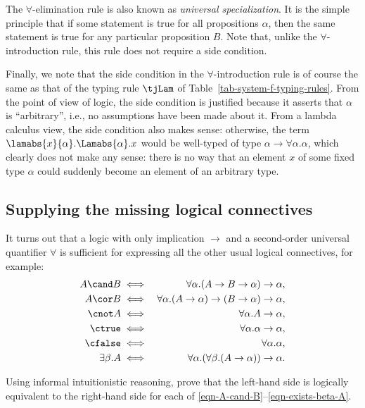 \documentclass[12pt]{article}
\begin{document}
The $\forall$-elimination rule is also known as {\em universal
  specialization}. It is the simple principle that if some statement
is true for all propositions $\alpha$, then the same statement is true for
any particular proposition $B$. Note that, unlike the $\forall$-introduction
rule, this rule does not require a side condition. 

Finally, we note that the side condition in the $\forall$-introduction
rule is of course the same as that of the typing rule $\tjLam$ of
Table~\ref{tab-system-f-typing-rules}. From the point of view of
logic, the side condition is justified because it asserts that
$\alpha$ is ``arbitrary'', i.e., no assumptions have been made about
it. From a lambda calculus view, the side condition also makes sense:
otherwise, the term $\lamabs{x}{\alpha}.\Lamabs{\alpha}.x$ would be
well-typed of type $\alpha\to\forall\alpha.\alpha$, which clearly does
not make any sense: there is no way that an element $x$ of some fixed
type $\alpha$ could suddenly become an element of an arbitrary type. 

\subsection{Supplying the missing logical connectives}

It turns out that a logic with only implication $\to$ and a
second-order universal quantifier $\forall$ is sufficient for
expressing all the other usual logical connectives, for example:
\begin{eqnarray}
  A\cand B &\iff& \forall\alpha.(A\to B\to\alpha)\to\alpha,\label{eqn-A-cand-B}\\
  A\cor B &\iff& \forall\alpha.(A\to\alpha)\to(B\to\alpha)\to\alpha,\label{eqn-A-cor-B}\\
  \cnot A &\iff& \forall\alpha.A\to \alpha,\\
  \ctrue &\iff& \forall\alpha.\alpha\to\alpha,\\
  \cfalse &\iff& \forall\alpha.\alpha,\\
  \exists\beta.A &\iff& \forall\alpha.(\forall\beta.(A\to\alpha))\to\alpha.\label{eqn-exists-beta-A}
\end{eqnarray}

\begin{exercise}
  Using informal intuitionistic reasoning, prove that the left-hand side
  is logically equivalent to the right-hand side for each of
  {\eqref{eqn-A-cand-B}}--{\eqref{eqn-exists-beta-A}}.
\end{exercise}
\end{document}
